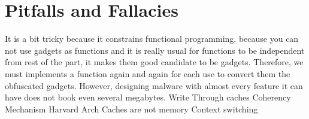 	\section{Pitfalls and Fallacies}
		It is a bit tricky because it constrains functional programming, because you can not use gadgets as functions and it is really usual for functions to be independent from rest of the part, it makes them good candidate to be gadgets. Therefore, we must implements a function again and again for each use to convert them the obfuscated gadgets. However, designing malware with almost every feature it can have does not book even several megabytes.
		Write Through caches
		Coherency Mechanism
		Harvard Arch
		Caches are not memory
		Context switching